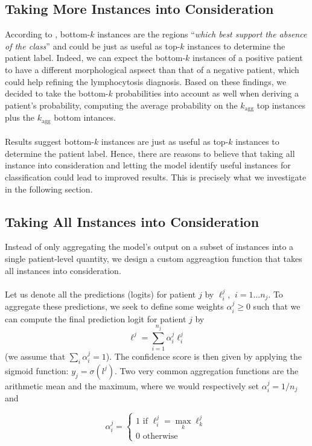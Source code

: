\documentclass[final]{cvpr}
\begin{document}
	\subsection{Taking More Instances into Consideration}
	\label{topbottom}
	
	According to \cite{owkin}, bottom-$k$ instances are the regions “\textit{which best support the absence of the class}” and could be just as useful as top-$k$ instances to determine the patient label. Indeed, we can expect the bottom-$k$ instances of a positive patient to have a different morphological aspsect than that of a negative patient, which could help refining the lymphocytosis diagnosis. Based on these findings, we decided to take the bottom-$k$ probabilities into account as well when deriving a patient's probability, computing the average probability on the $k_{\text{agg}}$ top instances plus the $k_{\text{agg}}$ bottom intances.\\
	\\
	Results suggest bottom-$k$ instances are just as useful as top-$k$ instances to determine the patient label. Hence, there are reasons to believe that taking all instance into consideration and letting the model identify useful instances for classification could lead to improved results. This is precisely what we investigate in the following section.
	
	\subsection{Taking All Instances into Consideration}
	\label{sec:custom}
	
	Instead of only aggregating the model's output on a subset of instances into a single patient-level quantity, we design a custom aggreagtion function that takes all instances into consideration.\\
	\\
	Let us denote all the predictions (logits) for patient $j$ by $\ell_i^j$, $\: i=1 \dots n_j$.
	To aggregate these predictions, we seek to define some weights $\alpha_i^j \geq 0$ such that we can compute the final prediction logit for patient $j$ by
	$$\ell^j = \sum_{i=1}^{n_j} \alpha_i^j \ell_i^j$$
	(we assume that $\sum_i \alpha_i^j = 1$).
	The confidence score is then given by applying the sigmoid function: $y_j = \sigma(l^j)$.
	Two very common aggregation functions are the arithmetic mean and the maximum, where we would respectively set $\alpha_i^j = 1/n_j$ and 
	
	$$
	\alpha_i^j  = \left\{
	\begin{array}{ll}
		1 \text{ if } \ell_i^j = \max_k \ell_k^j  \\
		0 \text{ otherwise}
	\end{array}
	\right.
	$$
	
\end{document}
